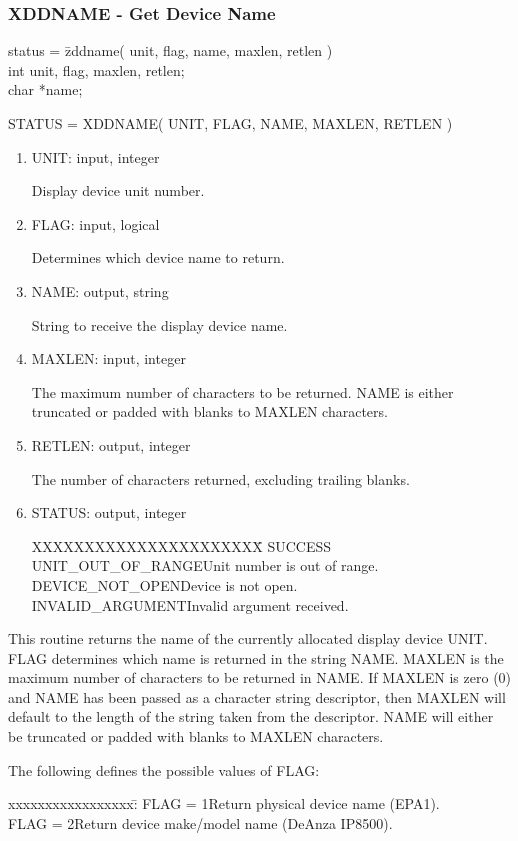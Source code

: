 \subsubsection{XDDNAME - Get Device Name}
\begin{tabbing}
status = \=zddname( unit, flag, name, maxlen, retlen )\\
\>int  unit, flag, maxlen, retlen;\\
\>char  *name;\\
\end{tabbing}
STATUS = XDDNAME( UNIT, FLAG, NAME, MAXLEN, RETLEN )
\begin{enumerate}
\item UNIT:  input, integer

Display device unit number.
\item FLAG:  input, logical

Determines which device name to return.
\item NAME:  output, string

String to receive the display device name.
\item MAXLEN:  input, integer

The maximum number of characters to be returned.  NAME is either
truncated or padded with blanks to MAXLEN characters.
\item RETLEN:  output, integer

The number of characters returned, excluding trailing blanks.
\item STATUS:  output, integer
\begin{tabbing}
XXXXXXXXXXXXXXXXXXXXXX\=\kill
SUCCESS\\
UNIT\_OUT\_OF\_RANGE\>Unit number is out of range.\\
DEVICE\_NOT\_OPEN\>Device is not open.\\
INVALID\_ARGUMENT\>Invalid argument received.\\
\end{tabbing}
\end{enumerate}
This routine returns the name of the currently allocated display
device UNIT.  FLAG determines which name is returned in the string
NAME.  MAXLEN is the maximum number of characters to be returned in
NAME.  If MAXLEN is zero (0) and NAME has been passed as a character
string descriptor, then MAXLEN will default to the length of the
string taken from the descriptor.  NAME will either be truncated
or padded with blanks to MAXLEN characters.

The following defines the possible values of FLAG:
\begin{tabbing}
xxxxxxxxxxxxxxxxx:\=\kill
FLAG = 1\>Return physical device name (EPA1).\\
FLAG = 2\>Return device make/model name (DeAnza IP8500).\\
\end{tabbing}
\newpage
